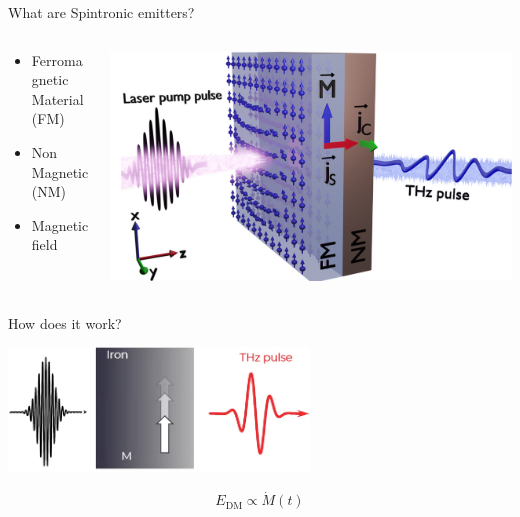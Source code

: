 \documentclass[aspectratio=1610, 9pt]{beamer}
\begin{document}
\begin{frame}{What are Spintronic emitters?}
  \begin{columns}
    \begin{column}{0.3\textwidth}
      \begin{itemize}
        \item Ferromagnetic Material (FM)
        \vspace{0.3in}
        \item Non Magnetic (NM)
        \vspace{0.3in}
        \item Magnetic field
      \end{itemize}
    \end{column}
    \begin{column}{.6\textwidth}
      \includegraphics[width=\textwidth]{pics/emitter.png}
    \end{column}
  \end{columns}
\end{frame}

\begin{frame}{How does it work?}
  \begin{center}
  \includegraphics[width=0.6\textwidth]{pics/quenching.png}
  \end{center}
  \begin{equation}
    E_\text{DM} \propto \dot{M}(t)
  \end{equation}
\end{frame}
\end{document}

